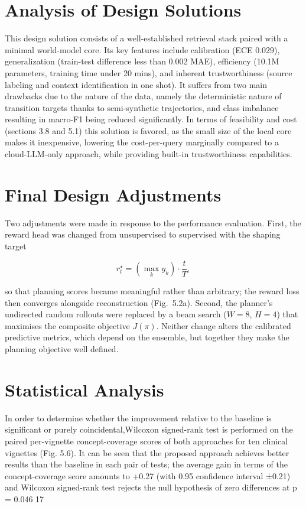 \section{Analysis of Design Solutions}
This design solution consists of a well-established retrieval stack paired with a minimal world-model core. Its key features include calibration (ECE 0.029), generalization (train-test difference less than 0.002 MAE), efficiency (10.1M parameters, training time under 20 mins), and inherent trustworthiness (source labeling and context identification in one shot). It suffers from two main drawbacks due to the nature of the data, namely the deterministic nature of transition targets thanks to semi-synthetic trajectories, and class imbalance resulting in macro-F1 being reduced significantly. In terms of feasibility and cost (sections 3.8 and 5.1) this solution is favored, as the small size of the local core makes it inexpensive, lowering the cost-per-query marginally compared to a cloud-LLM-only approach, while providing built-in trustworthiness capabilities.

\section{Final Design Adjustments}
Two adjustments were made in response to the performance evaluation. First, the reward head was changed from unsupervised to supervised with the shaping target

\[
r_t^{\star} = \left( \max_k y_k \right) \cdot \frac{t}{T},
\]

so that planning scores became meaningful rather than arbitrary; the reward loss then converges alongside reconstruction (Fig.~5.2a). Second, the planner's undirected random rollouts were replaced by a beam search ($W = 8$, $H = 4$) that maximises the composite objective $J(\pi)$. Neither change alters the calibrated predictive metrics, which depend on the ensemble, but together they make the planning objective well defined.

\section{Statistical Analysis}

In order to determine whether the improvement relative to the baseline is significant or purely coincidental,Wilcoxon signed-rank test is performed on the paired per-vignette concept-coverage scores of both approaches for ten clinical vignettes (Fig. 5.6). It can be seen that the proposed approach achieves better results than the baseline in each pair of tests; the average gain in terms of the concept-coverage score amounts to +0.27 (with 0.95 confidence interval ±0.21) and Wilcoxon signed-rank test rejects the null hypothesis of zero differences at p = 0.046 17 

